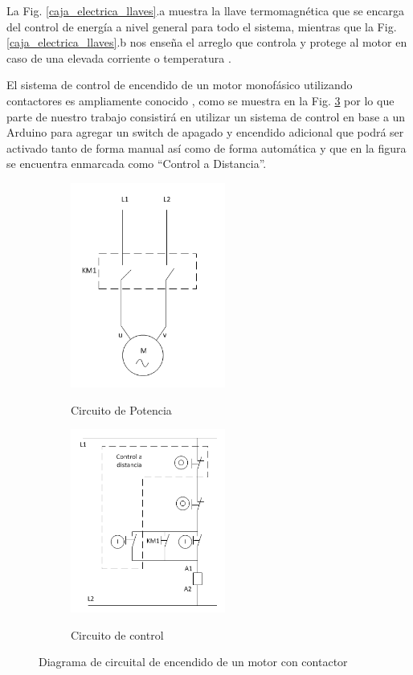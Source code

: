 \documentclass[main_conf.tex]{subfiles}
\begin{document}
La Fig. \ref{caja_electrica_llaves}.a muestra la llave termomagnética
que se encarga del control de energía a nivel general para todo el
sistema, mientras que la Fig. \ref{caja_electrica_llaves}.b nos enseña
el arreglo que controla y protege al motor en caso de
una elevada corriente o temperatura \cite{Motor_control:schneider}.

El sistema de control de encendido de un motor monofásico utilizando
contactores es ampliamente conocido \cite{manual_electrotecnica:schneider},
como se muestra en la Fig. \ref{diag_control_on_off_motor} por lo que
parte de nuestro trabajo consistirá en utilizar un sistema de control en
base a un Arduino para agregar un switch de apagado y encendido adicional
que podrá ser activado tanto de forma manual así como de forma automática y
que en la figura se encuentra enmarcada como “Control a Distancia”.

\begin{figure}[t]
  \centering
  \begin{subfigure}[b]{0.5\textwidth}
    \centering
    \includegraphics[width=2.0in]{../img/caja_electrica/Circuito_de_potencia.png}
    \label{Circuito_de_potencia}
    \caption{Circuito de Potencia}
  \end{subfigure}

  \begin{subfigure}[b]{0.5\textwidth}
    \centering
    \includegraphics[width=2.0in]{../img/caja_electrica/Circuito_de_control.png}
    \label{Circuito_de_control}
    \caption{Circuito de control}
  \end{subfigure}

  \caption{Diagrama de circuital de encendido de un motor con contactor}
  \label{diag_control_on_off_motor}
\end{figure}
\end{document}
